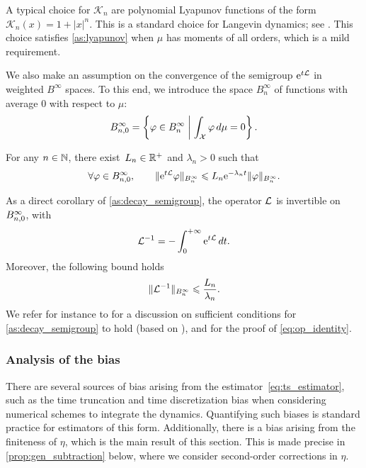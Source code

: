 A typical choice for $\mathcal{K}_n$ are polynomial Lyapunov functions of the form $\mathcal{K}_n(x) = 1+|x|^n$. This is a standard choice for Langevin dynamics; see \cite{mattingly2002,talay2002}. This choice satisfies \cref{as:lyapunov} when $\mu$ has moments of all orders, which is a mild requirement.

We also make an assumption on the convergence of the semigroup $\mathrm{e}^{t\mathcal{L}}$ in weighted $B^\infty$ spaces. To this end, we introduce the space $B^\infty_n$ of functions with average 0 with respect to $\mu$:
%
\begin{equation}
    B_{n,0}^{\infty} = \left\{\varphi \in B^\infty_n \; \middle| \; \int_\mathcal{X} \varphi \, d\mu = 0\right\}.
\end{equation}
%

\begin{assumption}
	\label{as:decay_semigroup}
	For any $n\in\mathbb{N}$, there exist~$L_n \in \mathbb{R}^+$ and $\lambda_n>0$ such that
	\begin{equation}
		\forall \varphi\in B_{n,0}^{\infty}, \qquad \|\mathrm{e}^{t\mathcal{L}}\varphi\|_{B^\infty_n} \leqslant L_n\mathrm{e}^{-\lambda_n t}\lVert\varphi\rVert_{B^\infty_n}.
	\label{eq:decay}
	\end{equation}
\end{assumption}
%

As a direct corollary of \cref{as:decay_semigroup}, the operator $\mathcal{L}$ is invertible on $B_{n,0}^{\infty}$, with
%
\begin{equation}
	\mathcal{L}^{-1} = -\int_0^{+\infty} \mathrm{e}^{t\mathcal{L}} \, dt.
	\label{eq:op_identity}
\end{equation}
%
Moreover, the following bound holds
%
\begin{equation}
	\lVert\mathcal{L}^{-1}\rVert_{B^\infty_n} \leqslant \frac{L_n}{\lambda_n}.
	\label{eq:Linv_bound}
\end{equation}
%
We refer for instance to \cite[Section 2]{acta_numerica2016} for a discussion on sufficient conditions for \cref{as:decay_semigroup} to hold (based on \cite{luc2006,mattingly2011}), and for the proof of \eqref{eq:op_identity}. 

\subsubsection{Analysis of the bias}
\label{subsubsec:bias_analysis}
%
There are several sources of bias arising from the estimator~\eqref{eq:ts_estimator}, such as the time truncation and time discretization bias when considering numerical schemes to integrate the dynamics. Quantifying such biases is standard practice for estimators of this form. Additionally, there is a bias arising from the finiteness of $\eta$, which is the main result of this section. This is made precise in \cref{prop:gen_subtraction} below, where we consider second-order corrections in $\eta$. 

